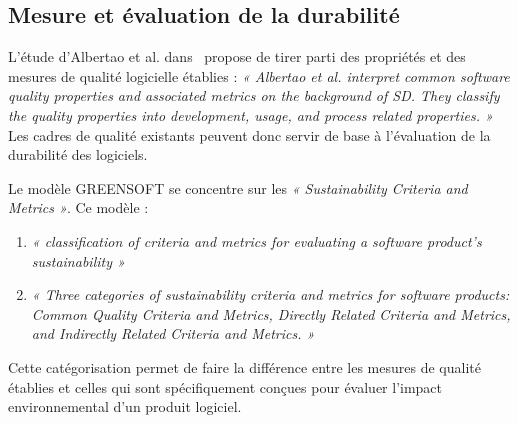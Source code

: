 
\subsection{Mesure et évaluation de la durabilité}
L'étude d'Albertao et al. dans~\cite{GreenSoftModel} propose de tirer parti des propriétés et des mesures de qualité logicielle établies : \emph{« Albertao et al. interpret common software quality properties and associated metrics on the background of SD. They classify the quality properties into development, usage, and process related properties. »} Les cadres de qualité existants peuvent donc servir de base à l'évaluation de la durabilité des logiciels.


Le modèle GREENSOFT se concentre sur les \emph{« Sustainability Criteria and Metrics »}. 
Ce modèle :
\begin{enumerate}
    \item \emph{« classification of criteria and metrics for evaluating a software product’s sustainability »}~\cite{GreenSoftModel}
    \item \emph{« Three categories of sustainability criteria and metrics for software products: Common Quality Criteria and Metrics, Directly Related Criteria and Metrics, and Indirectly Related Criteria and Metrics. »}~\cite{GreenSoftModel}
\end{enumerate}
Cette catégorisation permet de faire la différence entre les mesures de qualité établies et celles qui sont spécifiquement conçues pour évaluer l'impact environnemental d'un produit logiciel.


